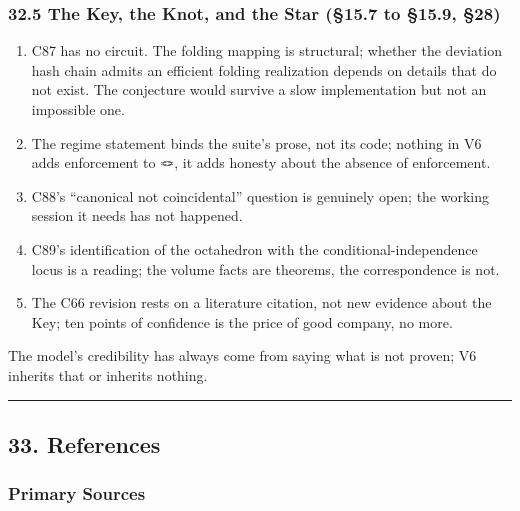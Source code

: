 \documentclass[
]{article}
\providecommand{\tightlist}{%
  \setlength{\itemsep}{0pt}\setlength{\parskip}{0pt}}
\begin{document}
\subsubsection{32.5 The Key, the Knot, and the Star (§15.7 to §15.9,
§28)}\label{the-key-the-knot-and-the-star-15.7-to-15.9-28}

\begin{enumerate}
\def\labelenumi{\arabic{enumi}.}
\tightlist
\item
  C87 has no circuit. The folding mapping is structural; whether the
  deviation hash chain admits an efficient folding realization depends
  on details that do not exist. The conjecture would survive a slow
  implementation but not an impossible one.
\item
  The regime statement binds the suite's prose, not its code; nothing in
  V6 adds enforcement to 🪢, it adds honesty about the absence of
  enforcement.
\item
  C88's ``canonical not coincidental'' question is genuinely open; the
  working session it needs has not happened.
\item
  C89's identification of the octahedron with the
  conditional-independence locus is a reading; the volume facts are
  theorems, the correspondence is not.
\item
  The C66 revision rests on a literature citation, not new evidence
  about the Key; ten points of confidence is the price of good company,
  no more.
\end{enumerate}

The model's credibility has always come from saying what is not proven;
V6 inherits that or inherits nothing.

\begin{center}\rule{0.5\linewidth}{0.5pt}\end{center}

\subsection{33. References}\label{references}

\subsubsection{Primary Sources}\label{primary-sources}
\end{document}
